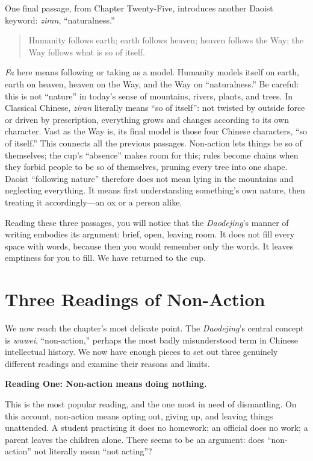 One final passage, from Chapter Twenty-Five, introduces another Daoist keyword: \textit{ziran}, ``naturalness.''

\begin{quote}
Humanity follows earth; earth follows heaven; heaven follows the Way; the Way follows what is so of itself.
\end{quote}
\textit{Fa} here means following or taking as a model. Humanity models itself on earth, earth on heaven, heaven on the Way, and the Way on ``naturalness.'' Be careful: this is not ``nature'' in today's sense of mountains, rivers, plants, and trees. In Classical Chinese, \textit{ziran} literally means ``so of itself'': not twisted by outside force or driven by prescription, everything grows and changes according to its own character. Vast as the Way is, its final model is those four Chinese characters, ``so of itself.'' This connects all the previous passages. Non-action lets things be so of themselves; the cup's ``absence'' makes room for this; rules become chains when they forbid people to be so of themselves, pruning every tree into one shape. Daoist ``following nature'' therefore does not mean lying in the mountains and neglecting everything. It means first understanding something's own nature, then treating it accordingly---an ox or a person alike.

Reading these three passages, you will notice that the \textit{Daodejing}'s manner of writing embodies its argument: brief, open, leaving room. It does not fill every space with words, because then you would remember only the words. It leaves emptiness for you to fill. We have returned to the cup.

\section{Three Readings of Non-Action}
We now reach the chapter's most delicate point. The \textit{Daodejing}'s central concept is \textit{wuwei}, ``non-action,'' perhaps the most badly misunderstood term in Chinese intellectual history. We now have enough pieces to set out three genuinely different readings and examine their reasons and limits.

\textbf{Reading One: Non-action means doing nothing.}

This is the most popular reading, and the one most in need of dismantling. On this account, non-action means opting out, giving up, and leaving things unattended. A student practising it does no homework; an official does no work; a parent leaves the children alone. There seems to be an argument: does ``non-action'' not literally mean ``not acting''?

